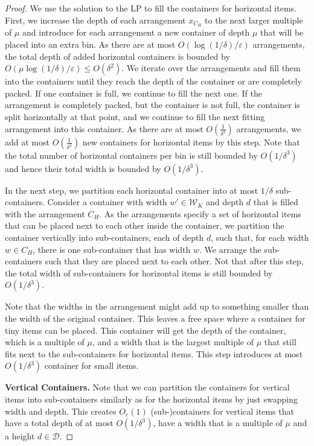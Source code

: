 \documentclass[a4paper,UKenglish,cleveref, autoref, thm-restate]{lipics-v2021}
\newcommand{\eps}{\varepsilon}
\newcommand{\tin}{tiny\xspace}
\begin{document}
\begin{proof}
We use the solution to the LP to fill the containers for horizontal items.
First, we increase the depth of each arrangement $x_{C_H}$ to the next larger multiple of $\mu$ and introduce for each arrangement a new container of depth $\mu$ that will be placed into an extra bin.
As there are at most $O(\log(1/\delta)/\eps)$ arrangements, the total depth of added horizontal containers is bounded by $O(\mu \log(1/\delta)/\eps)\leq O(\delta^2)$.
We iterate over the arrangements and fill them into the containers until they reach the depth of the container or are completely packed.
If one container is full, we continue to fill the next one. If the arrangement is completely packed, but the container is not full, the container is split horizontally at that point, and we continue to fill the next fitting arrangement into this container.
As there are at most $O(\frac{1}{\delta^2})$ arrangements, we add at most $O(\frac{1}{\delta^2})$ new containers for horizontal items by this step.
Note that the total number of horizontal containers per bin is still bounded by $O(1/\delta^3)$ and hence their total width is bounded by $O(1/\delta^3)$.

In the next step, we partition each horizontal container into at most $1/\delta$ sub-containers.
Consider a container with width $w' \in \mathcal{W}_K$ and depth $d$ that is filled with the arrangement $C_H$.
As the arrangements specify a set of horizontal items that can be placed next to each other inside the container, we partition the container vertically into sub-containers, each of depth $d$, such that, for each width $w \in C_H$, there is one sub-container that has width $w$.
We arrange the sub-containers such that they are placed next to each other.
Not that after this step, the total width of sub-containers for horizontal items is still bounded by $O(1/\delta^3)$.

Note that the widths in the arrangement might add up to something smaller than the width of the original container. 
This leaves a free space where a container for \tin items can be placed. 
This container will get the depth of the container, which is a multiple of $\mu$, and a width that is the largest multiple of $\mu$ that still fits next to the sub-containers for horizontal items.
This step introduces at most $O(1/\delta^3)$ container for small items.


\textbf{Vertical Containers.}
Note that we can partition the containers for vertical items into sub-containers similarly as for the horizontal items by just swapping width and depth. 
This creates $O_{\eps}(1)$ (sub-)containers for vertical items that have a total depth of at most $O(1/\delta^3)$, have a width that is a multiple of $\mu$ and a height $d\in \mathcal{D}$.




\end{proof}
\end{document}
